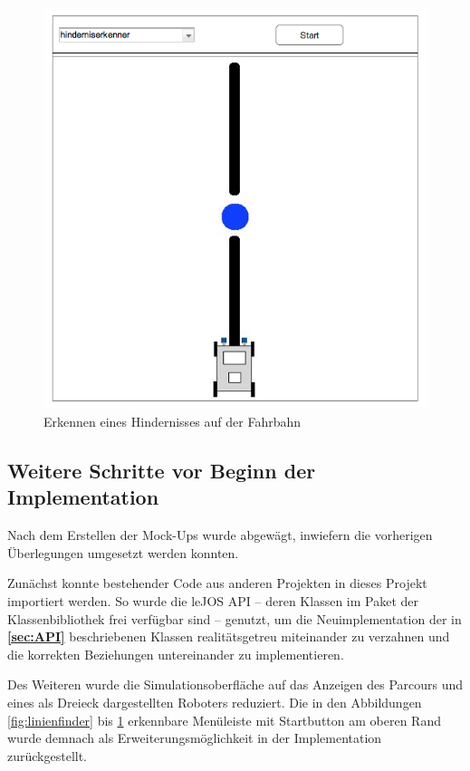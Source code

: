 \documentclass[paper=a4, DIV=calc, BCOR=12mm, twoside=on, onecolumn=on, open = right, titlepage =on, parskip =half-, headsepline = on, footsepline = off, chapterprefix = off, appendixprefix = on, fontsize = 12pt, numbers = noenddot, abstract = on]{scrbook}
\begin{document}
\begin{figure}[htb]
\centering
\includegraphics[scale=0.5]{images/mockup_hinderniserkenner.png}
\caption{Erkennen eines Hindernisses auf der Fahrbahn}
\label{fig:hinderniserkenner}
\end{figure}


\par \singlespacing
\subsection{Weitere Schritte vor Beginn der Implementation}
\onehalfspacing
Nach dem Erstellen der Mock-Ups wurde abgewägt, inwiefern die vorherigen Überlegungen umgesetzt werden konnten. 

Zunächst konnte bestehender Code aus anderen Projekten in dieses Projekt importiert werden. So wurde die leJOS API -- deren Klassen im Paket der Klassenbibliothek frei verfügbar sind -- genutzt, um die Neuimplementation der in \textbf{\ref{sec:API}} beschriebenen Klassen realitätsgetreu miteinander zu verzahnen und die korrekten Beziehungen untereinander zu implementieren.

Des Weiteren wurde die Simulationsoberfläche auf das Anzeigen des Parcours und eines als Dreieck dargestellten Roboters reduziert. Die in den Abbildungen \ref{fig:linienfinder} bis  \ref{fig:hinderniserkenner} erkennbare Menüleiste mit Startbutton am oberen Rand wurde demnach als Erweiterungsmöglichkeit in der Implementation zurückgestellt.
\end{document}
